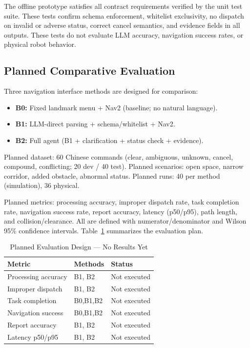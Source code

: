 \documentclass[conference]{IEEEtran}
\begin{document}
The offline prototype satisfies all contract requirements verified by the unit test
suite. These tests confirm schema enforcement, whitelist exclusivity, no dispatch on
invalid or adverse status, correct cancel semantics, and evidence fields in all
outputs. These tests do not evaluate LLM accuracy, navigation success rates, or
physical robot behavior.

\subsection{Planned Comparative Evaluation}

Three navigation interface methods are designed for comparison:
\begin{itemize}
  \item \textbf{B0:} Fixed landmark menu + Nav2 (baseline; no natural language).
  \item \textbf{B1:} LLM-direct parsing + schema/whitelist + Nav2.
  \item \textbf{B2:} Full agent (B1 + clarification + status check + evidence).
\end{itemize}

Planned dataset: 60 Chinese commands (clear, ambiguous, unknown, cancel, compound,
conflicting; 20 dev / 40 test). Planned scenarios: open space, narrow corridor, added
obstacle, abnormal status. Planned runs: 40 per method (simulation), 36 physical.

Planned metrics: processing accuracy, improper dispatch rate, task completion rate,
navigation success rate, report accuracy, latency (p50/p95), path length, and
collision/clearance. All are defined with numerator/denominator and Wilson 95\%
confidence intervals. Table~\ref{tab:plan} summarizes the evaluation plan.

\begin{table}[htbp]
\caption{Planned Evaluation Design --- No Results Yet}
\label{tab:plan}
\centering
\renewcommand{\arraystretch}{1.1}
\begin{tabular}{@{}p{2.4cm}p{1.0cm}p{1.5cm}@{}}
\toprule
\textbf{Metric} & \textbf{Methods} & \textbf{Status} \\
\midrule
Processing accuracy   & B1, B2    & Not executed \\
Improper dispatch     & B1, B2    & Not executed \\
Task completion       & B0,B1,B2  & Not executed \\
Navigation success    & B0,B1,B2  & Not executed \\
Report accuracy       & B1, B2    & Not executed \\
Latency p50/p95       & B1, B2    & Not executed \\
\bottomrule
\end{tabular}
\end{table}
\end{document}
